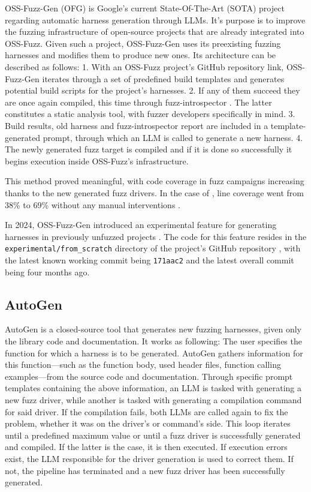 \documentclass[
  a4paper,
  DIV=11,
  numbers=noendperiod]{scrreprt}
\theoremstyle{definition}
\theoremstyle{remark}
\begin{document}
OSS-Fuzz-Gen (OFG) \autocite{liu2023,oss-fuzz-gen} is Google's current
State-Of-The-Art (SOTA) project regarding automatic harness generation
through LLMs. It's purpose is to improve the fuzzing infrastructure of
open-source projects that are already integrated into OSS-Fuzz. Given
such a project, OSS-Fuzz-Gen uses its preexisting fuzzing harnesses and
modifies them to produce new ones. Its architecture can be described as
follows: 1. With an OSS-Fuzz project's GitHub repository link,
OSS-Fuzz-Gen iterates through a set of predefined build templates and
generates potential build scripts for the project's harnesses. 2. If any
of them succeed they are once again compiled, this time through
fuzz-introspector \autocite{fuzz-introspector}. The latter constitutes a
static analysis tool, with fuzzer developers specifically in mind. 3.
Build results, old harness and fuzz-introspector report are included in
a template-generated prompt, through which an LLM is called to generate
a new harness. 4. The newly generated fuzz target is compiled and if it
is done so successfully it begins execution inside OSS-Fuzz's
infrastructure.

This method proved meaningful, with code coverage in fuzz campaigns
increasing thanks to the new generated fuzz drivers. In the case of
\autocite{thomason2025}, line coverage went from 38\% to 69\% without
any manual interventions \autocite{liu2023}.

In 2024, OSS-Fuzz-Gen introduced an experimental feature for generating
harnesses in previously unfuzzed projects
\autocite{oss-fuzzmaintainers2024}. The code for this feature resides in
the \texttt{experimental/from\_scratch} directory of the project's
GitHub repository \autocite{oss-fuzz-gen}, with the latest known working
commit being \texttt{171aac2} and the latest overall commit being four
months ago.

\subsection{AutoGen}\label{autogen}

AutoGen \autocite{sun2024} is a closed-source tool that generates new
fuzzing harnesses, given only the library code and documentation. It
works as following: The user specifies the function for which a harness
is to be generated. AutoGen gathers information for this function---such
as the function body, used header files, function calling
examples---from the source code and documentation. Through specific
prompt templates containing the above information, an LLM is tasked with
generating a new fuzz driver, while another is tasked with generating a
compilation command for said driver. If the compilation fails, both LLMs
are called again to fix the problem, whether it was on the driver's or
command's side. This loop iterates until a predefined maximum value or
until a fuzz driver is successfully generated and compiled. If the
latter is the case, it is then executed. If execution errors exist, the
LLM responsible for the driver generation is used to correct them. If
not, the pipeline has terminated and a new fuzz driver has been
successfully generated.
\end{document}

